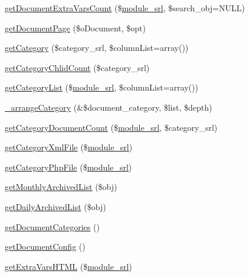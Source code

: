 \begin{DoxyCompactItemize}
\item 
\hyperlink{classdocumentModel_a91d03a635279fda1053a111ce13414b7}{get\+Document\+Extra\+Vars\+Count} (\$\hyperlink{ko_8install_8php_a370bb6450fab1da3e0ed9f484a38b761}{module\+\_\+srl}, \$search\+\_\+obj=N\+U\+LL)
\item 
\hyperlink{classdocumentModel_ac0d3f410a02bb462264c0ee902da4c8b}{get\+Document\+Page} (\$o\+Document, \$opt)
\item 
\hyperlink{classdocumentModel_a69db7f82ad9b45930a1531de4a88771f}{get\+Category} (\$category\+\_\+srl, \$column\+List=array())
\item 
\hyperlink{classdocumentModel_a9f645cdbdf163a360e7b018d6b499929}{get\+Category\+Chlid\+Count} (\$category\+\_\+srl)
\item 
\hyperlink{classdocumentModel_adb678b449b3b58d326f734870b478f8c}{get\+Category\+List} (\$\hyperlink{ko_8install_8php_a370bb6450fab1da3e0ed9f484a38b761}{module\+\_\+srl}, \$column\+List=array())
\item 
\hyperlink{classdocumentModel_adf3fb12772da62d991c1cd6638870740}{\+\_\+arrange\+Category} (\&\$document\+\_\+category, \$list, \$depth)
\item 
\hyperlink{classdocumentModel_a4d0ae40ec03a5dad5cb3c636a0475925}{get\+Category\+Document\+Count} (\$\hyperlink{ko_8install_8php_a370bb6450fab1da3e0ed9f484a38b761}{module\+\_\+srl}, \$category\+\_\+srl)
\item 
\hyperlink{classdocumentModel_ac281e6514ac76ffedcff7b89d0bcb130}{get\+Category\+Xml\+File} (\$\hyperlink{ko_8install_8php_a370bb6450fab1da3e0ed9f484a38b761}{module\+\_\+srl})
\item 
\hyperlink{classdocumentModel_a0b93c54ebe6ae6730169d25f09dd91d5}{get\+Category\+Php\+File} (\$\hyperlink{ko_8install_8php_a370bb6450fab1da3e0ed9f484a38b761}{module\+\_\+srl})
\item 
\hyperlink{classdocumentModel_a5e28d43ec8cba93b8017c169a2b57b23}{get\+Monthly\+Archived\+List} (\$obj)
\item 
\hyperlink{classdocumentModel_a9f7ad689da9b5a7b8f75fa2e48aec80a}{get\+Daily\+Archived\+List} (\$obj)
\item 
\hyperlink{classdocumentModel_a38ed2ba51a4ab187f2dd14e6dd92f5cc}{get\+Document\+Categories} ()
\item 
\hyperlink{classdocumentModel_a2e9e6fc1cc405b6c71c38b247f51756a}{get\+Document\+Config} ()
\item 
\hyperlink{classdocumentModel_a21dffa7f96fc5f28c525650dbd3bbba4}{get\+Extra\+Vars\+H\+T\+ML} (\$\hyperlink{ko_8install_8php_a370bb6450fab1da3e0ed9f484a38b761}{module\+\_\+srl})

\end{DoxyCompactItemize}
